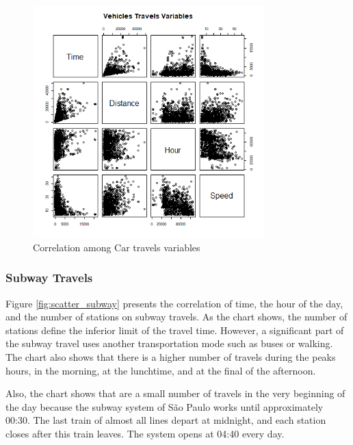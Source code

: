 \begin{figure}[!htb]
\centering
\includegraphics[width=0.8\textwidth]{figuras/chap-sp/scatter_car.png}
\caption{Correlation among Car travels variables}
\label{fig:scatter_car}
\end{figure}

\subsubsection{Subway Travels}

Figure \ref{fig:scatter_subway} presents the correlation of time, the hour of the day, and the number of stations on subway travels. As the chart shows, the number of stations define the inferior limit of the travel time. However, a significant part of the subway travel uses another transportation mode such as buses or walking. The chart also shows that there is a higher number of travels during the peaks hours, in the morning, at the lunchtime, and at the final of the afternoon.

Also, the chart shows that are a small number of travels in the very beginning of the day because the subway system of S\~ao Paulo works until approximately 00:30. The last train of almost all lines depart at midnight, and each station closes after this train leaves. The system opens at 04:40 every day. 

